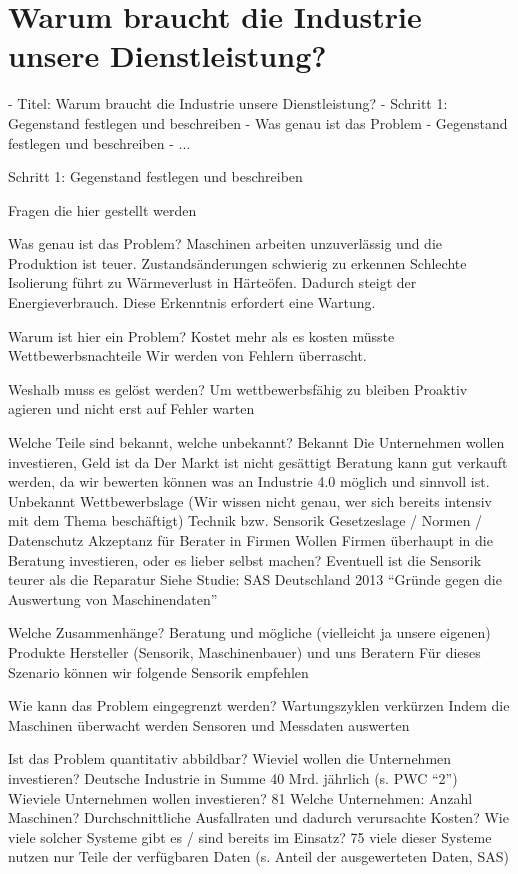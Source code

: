 \section{Warum braucht die Industrie unsere Dienstleistung?}

- Titel: Warum braucht die Industrie unsere Dienstleistung?
- Schritt 1: Gegenstand festlegen und beschreiben
- Was genau ist das Problem
- Gegenstand festlegen und beschreiben
- ...

Schritt 1: Gegenstand festlegen und beschreiben

Fragen die hier gestellt werden

Was genau ist das Problem?
Maschinen arbeiten unzuverlässig und die Produktion ist teuer.
Zustandsänderungen schwierig zu erkennen
Schlechte Isolierung führt zu Wärmeverlust in Härteöfen. Dadurch steigt der Energieverbrauch. Diese Erkenntnis erfordert eine Wartung.

Warum ist hier ein Problem?
Kostet mehr als es kosten müsste
Wettbewerbsnachteile
Wir werden von Fehlern überrascht.

Weshalb muss es gelöst werden?
Um wettbewerbsfähig zu bleiben
Proaktiv agieren und nicht erst auf Fehler warten

Welche Teile sind bekannt, welche unbekannt?
Bekannt
Die Unternehmen wollen investieren, Geld ist da
Der Markt ist nicht gesättigt
Beratung kann gut verkauft werden, da wir bewerten können was an Industrie 4.0 möglich und sinnvoll ist.
Unbekannt
Wettbewerbslage (Wir wissen nicht genau, wer sich bereits intensiv mit dem Thema beschäftigt)
Technik bzw. Sensorik
Gesetzeslage / Normen / Datenschutz
Akzeptanz für Berater in Firmen
Wollen Firmen überhaupt in die Beratung investieren, oder es lieber selbst machen?
Eventuell ist die Sensorik teurer als die Reparatur
Siehe Studie: SAS Deutschland 2013 “Gründe gegen die Auswertung von Maschinendaten”

Welche Zusammenhänge?
Beratung und mögliche (vielleicht ja unsere eigenen) Produkte
Hersteller (Sensorik, Maschinenbauer) und uns Beratern
Für dieses Szenario können wir folgende Sensorik empfehlen

Wie kann das Problem eingegrenzt werden?
Wartungszyklen verkürzen
Indem die Maschinen überwacht werden
Sensoren und Messdaten auswerten

Ist das Problem quantitativ abbildbar?
Wieviel wollen die Unternehmen investieren?
Deutsche Industrie in Summe 40 Mrd. jährlich (s. PWC “2”)
Wieviele Unternehmen wollen investieren?
81%
Welche Unternehmen: Anzahl Maschinen?
Durchschnittliche Ausfallraten und dadurch verursachte Kosten?
Wie viele solcher Systeme gibt es / sind bereits im Einsatz?
75%
viele dieser Systeme nutzen nur Teile der verfügbaren Daten (s. Anteil der ausgewerteten Daten, SAS) 

